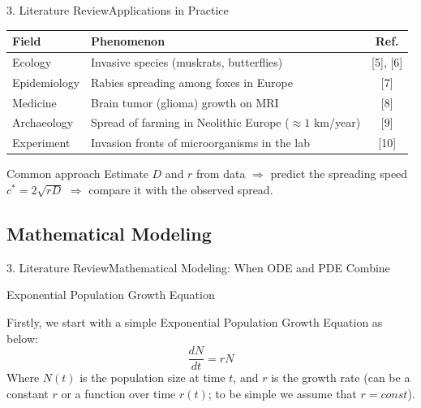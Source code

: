 \documentclass[10pt]{beamer}
\begin{document}
    \begin{frame}{3. Literature Review}{Applications in Practice}
      \begin{center}
        \small
        \renewcommand{\arraystretch}{1.3}
        \begin{tabular}{l l c}
          \hline
          \textbf{Field} & \textbf{Phenomenon} & \textbf{Ref.} \\
          \hline
          Ecology & Invasive species (muskrats, butterflies) & [5], [6] \\
          Epidemiology & Rabies spreading among foxes in Europe & [7] \\
          Medicine & Brain tumor (glioma) growth on MRI & [8] \\
          Archaeology & Spread of farming in Neolithic Europe ($\approx 1$ km/year) & [9] \\
          Experiment & Invasion fronts of microorganisms in the lab & [10] \\
          \hline
        \end{tabular}
      \end{center}
      \begin{block}{Common approach}
          Estimate $D$ and $r$ from data $\Rightarrow$ predict the spreading speed $c^{*} = 2\sqrt{rD}$ $\Rightarrow$ compare it with the observed spread.
      \end{block}
    \end{frame}

  \subsection{Mathematical Modeling}
    \begin{frame}{3. Literature Review}{Mathematical Modeling: When ODE and PDE Combine}
      \begin{center}
        \begin{block}{Exponential Population Growth Equation}
            \begin{minipage}{\textwidth}
              Firstly, we start with a simple Exponential Population Growth Equation as below:
              $$
              \dfrac{dN}{dt} = rN
              $$
              Where $N(t)$ is the population size at time $t$, and $r$ is the growth rate (can be a constant $r$ or a function over time $r(t)$; to be simple we assume that $r = const$).
            \end{minipage}
        \end{block}
      \end{center}
    \end{frame}
\end{document}

